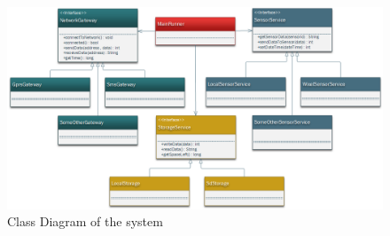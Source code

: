\documentclass[12pt, svn, draft]{rureport}
\begin{document}
\begin{figure}
\centering
\includegraphics[width=1\linewidth]{graphics/ClassDiagram}
\caption{Class Diagram of the system\label{fig:ClassDiagram}}
\end{figure}

\pagebreak


\end{document}
